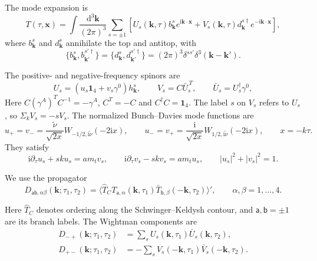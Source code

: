 \documentclass[a4paper,12pt]{article}
\newcommand{\ii}{\mathrm i}
\newcommand{\mb}{\mathbf}
\newcommand{\tn}{\tilde\nu}
\def\aa{\mathsf a}
\newcommand{\bb}{\mathsf b}
\newcommand{\di}{\mathrm d}
\begin{document}
The mode expansion is
\begin{equation}
 T(\tau,\mb x)=\int\frac{\di^3\mb k}{(2\pi)^3}\sum_{s=\pm1}
 \left[U_s(\mb k,\tau)b^s_{\mb k}e^{\ii\mb k\cdot\mb x}
       +V_s(\mb k,\tau)d^{s\dagger}_{\mb k}e^{-\ii\mb k\cdot\mb x}\right],
 \label{eq:dirac-mode-expansion}
\end{equation}
where $b^s_{\mb k}$ and $d^s_{\mb k}$ annihilate the top and antitop,
with
\begin{equation}
 \{b^s_{\mb k},b^{s'\dagger}_{\mb k'}\}
 =\{d^s_{\mb k},d^{s'\dagger}_{\mb k'}\}
 =(2\pi)^3\delta^{ss'}\delta^3(\mb k-\mb k').
 \label{eq:dirac-anticommutators}
\end{equation}

The positive- and negative-frequency spinors are
\begin{equation}
 U_s=(u_s\mathbf1_4+v_s\gamma^0)h^s_{\mb k},\qquad
 V_s=C\bar U_s^{\,T},\qquad \bar U_s=U_s^\dagger\gamma^0,
 \label{eq:dirac-mode-spinors}
\end{equation}
Here $C(\gamma^A)^TC^{-1}=-\gamma^A$, $C^T=-C$ and
$C^\dagger C=\mathbf1_4$. 
The label $s$ on $V_s$ refers to $U_s$,
so $\Sigma_kV_s=-sV_s$. The normalized Bunch--Davies mode functions are
\begin{equation}
 u_+=v_- =\frac{\tn}{\sqrt{2x}}
 W_{-1/2,\ii\tn}(-2\ii x),\qquad
 u_-=v_+ =\frac{\ii}{\sqrt{2x}}
 W_{1/2,\ii\tn}(-2\ii x),\qquad x=-k\tau.
 \label{eq:dirac-radial-modes}
\end{equation}
They satisfy
\begin{equation}
 \ii\partial_\tau u_s+sku_s=am_tv_s,\qquad
 \ii\partial_\tau v_s-skv_s=am_tu_s,\qquad
 |u_s|^2+|v_s|^2=1.
 \label{eq:dirac-radial-eom}
\end{equation}

We use the propagator
\begin{equation}
 D_{\aa\bb,\alpha\beta}(\mb k;\tau_1,\tau_2)
 =\langle \hat{T}_C T_{\aa,\alpha}(\mb k,\tau_1)
                 \bar T_{\bb,\beta}(-\mb k,\tau_2)\rangle',
 \qquad \alpha,\beta=1,\ldots,4.
 \label{eq:dirac-propagator-definition}
\end{equation}

Here $\hat T_C$ denotes ordering along the Schwinger--Keldysh contour,
and $\aa,\bb=\pm1$ are its branch labels. The Wightman components are
\begin{align}
 D_{-+}(\mb k;\tau_1,\tau_2)
 &=\sum_s U_s(\mb k,\tau_1)\bar U_s(\mb k,\tau_2),\nonumber\\
 D_{+-}(\mb k;\tau_1,\tau_2)
 &=-\sum_s V_s(-\mb k,\tau_1)\bar V_s(-\mb k,\tau_2).
 \label{eq:dirac-wightman}
\end{align}
\end{document}
